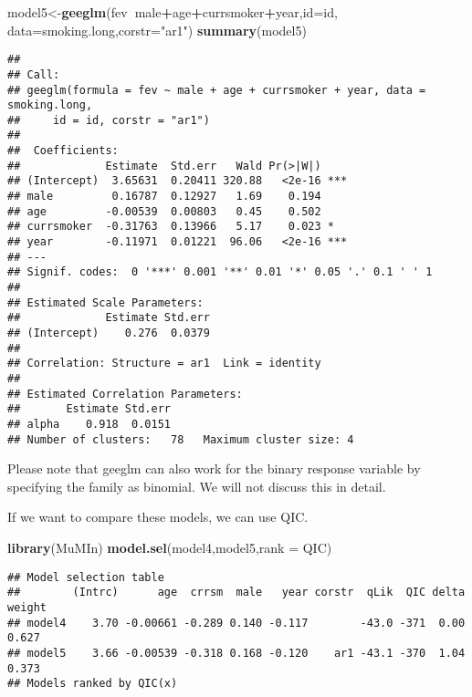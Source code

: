 \documentclass[]{book}
\newenvironment{Shaded}{\begin{snugshade}}{\end{snugshade}}
\newcommand{\KeywordTok}[1]{\textcolor[rgb]{0.13,0.29,0.53}{\textbf{#1}}}
\newcommand{\DataTypeTok}[1]{\textcolor[rgb]{0.13,0.29,0.53}{#1}}
\newcommand{\StringTok}[1]{\textcolor[rgb]{0.31,0.60,0.02}{#1}}
\newcommand{\OperatorTok}[1]{\textcolor[rgb]{0.81,0.36,0.00}{\textbf{#1}}}
\newcommand{\NormalTok}[1]{#1}
\theoremstyle{definition}
\theoremstyle{definition}
\theoremstyle{definition}
\theoremstyle{remark}
\begin{document}
\begin{Shaded}
\begin{Highlighting}[]
\NormalTok{model5<-}\KeywordTok{geeglm}\NormalTok{(fev}\OperatorTok{~}\NormalTok{male}\OperatorTok{+}\NormalTok{age}\OperatorTok{+}\NormalTok{currsmoker}\OperatorTok{+}\NormalTok{year,}\DataTypeTok{id=}\NormalTok{id, }\DataTypeTok{data=}\NormalTok{smoking.long,}\DataTypeTok{corstr=}\StringTok{"ar1"}\NormalTok{)}
\KeywordTok{summary}\NormalTok{(model5)}
\end{Highlighting}
\end{Shaded}

\begin{verbatim}
## 
## Call:
## geeglm(formula = fev ~ male + age + currsmoker + year, data = smoking.long, 
##     id = id, corstr = "ar1")
## 
##  Coefficients:
##             Estimate  Std.err   Wald Pr(>|W|)    
## (Intercept)  3.65631  0.20411 320.88   <2e-16 ***
## male         0.16787  0.12927   1.69    0.194    
## age         -0.00539  0.00803   0.45    0.502    
## currsmoker  -0.31763  0.13966   5.17    0.023 *  
## year        -0.11971  0.01221  96.06   <2e-16 ***
## ---
## Signif. codes:  0 '***' 0.001 '**' 0.01 '*' 0.05 '.' 0.1 ' ' 1
## 
## Estimated Scale Parameters:
##             Estimate Std.err
## (Intercept)    0.276  0.0379
## 
## Correlation: Structure = ar1  Link = identity 
## 
## Estimated Correlation Parameters:
##       Estimate Std.err
## alpha    0.918  0.0151
## Number of clusters:   78   Maximum cluster size: 4
\end{verbatim}

Please note that geeglm can also work for the binary response variable
by specifying the family as binomial. We will not discuss this in
detail.

If we want to compare these models, we can use QIC.

\begin{Shaded}
\begin{Highlighting}[]
\KeywordTok{library}\NormalTok{(MuMIn) }
\KeywordTok{model.sel}\NormalTok{(model4,model5,}\DataTypeTok{rank =}\NormalTok{ QIC)}
\end{Highlighting}
\end{Shaded}

\begin{verbatim}
## Model selection table 
##        (Intrc)      age  crrsm  male   year corstr  qLik  QIC delta weight
## model4    3.70 -0.00661 -0.289 0.140 -0.117        -43.0 -371  0.00  0.627
## model5    3.66 -0.00539 -0.318 0.168 -0.120    ar1 -43.1 -370  1.04  0.373
## Models ranked by QIC(x)
\end{verbatim}
\end{document}
